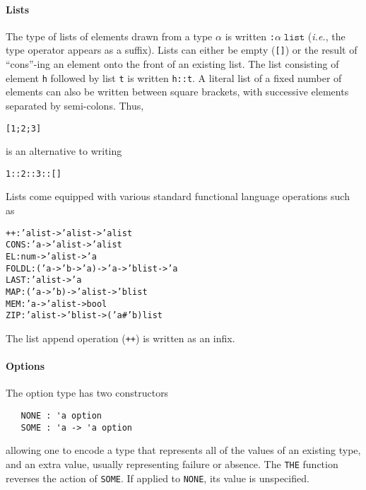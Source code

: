 \documentclass[11pt]{article}
\newcommand{\ie}{\emph{i.e.}}
\begin{document}
\paragraph{Lists} The type of lists of elements drawn from a type
$\alpha$ is written \texttt{:}$\alpha\;\texttt{list}$ (\ie, the type
operator appears as a suffix). Lists can either be empty (\texttt{[]})
or the result of ``cons''-ing an element onto the front of an existing
list.  The list consisting of element \texttt{h} followed by list
\texttt{t} is written \texttt{h::t}. A literal list of a fixed number
of elements can also be written between square brackets, with
successive elements separated by semi-colons.  Thus,
\begin{alltt}
   [1; 2; 3]
\end{alltt}
is an alternative to writing
\begin{alltt}
   1 :: 2 :: 3 :: []
\end{alltt}
Lists come equipped with various standard functional language
operations such as %
%
%
%
%
%
%
%
\begin{center}
\begin{minipage}{\textwidth}
\begin{alltt}
   ++    : 'a list -> 'a list -> 'a list
   CONS  : 'a -> 'a list -> 'a list
   EL    : num -> 'a list -> 'a
   FOLDL : ('a -> 'b -> 'a) -> 'a -> 'b list -> 'a
   LAST  : 'a list -> 'a
   MAP   : ('a -> 'b) -> 'a list -> 'b list
   MEM   : 'a -> 'a list -> bool
   ZIP   : 'a list -> 'b list -> ('a # 'b) list
\end{alltt}
\end{minipage}
\end{center}
The list append operation (\texttt{++}) is written as an infix.

\paragraph{Options} The option type has two constructors
%
%
\begin{verbatim}
   NONE : 'a option
   SOME : 'a -> 'a option
\end{verbatim}
allowing one to encode a type that represents all of the values of an
existing type, and an extra value, usually representing failure or
absence.  The %
%
\texttt{THE} function reverses the action of \texttt{SOME}.  If
applied to \texttt{NONE}, its value is unspecified.
\end{document}
